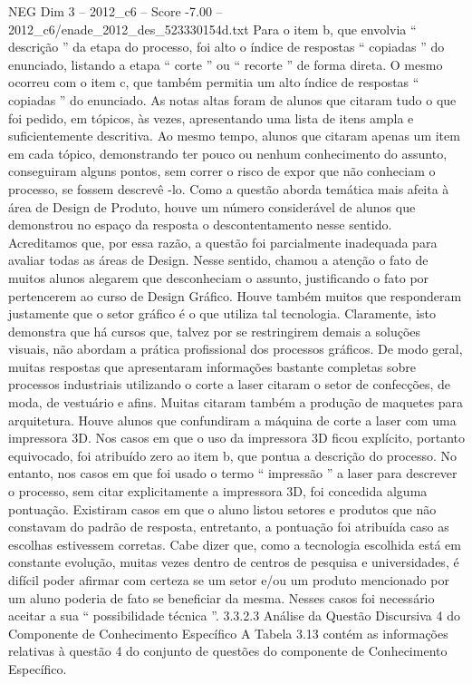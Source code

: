 \begin{textsample}{NEG Dim 3 – 2012\_c6 – Score -7.00 – 2012\_c6/enade\_2012\_des\_523330154d.txt}
Para o item b, que envolvia “ descrição ” da etapa do processo, foi alto o índice de respostas “ copiadas ” do enunciado, listando a etapa “ corte ” ou “ recorte ” de forma direta.
O mesmo ocorreu com o item c, que também permitia um alto índice de respostas “ copiadas ” do enunciado.
As notas altas foram de alunos que citaram tudo o que foi pedido, em tópicos, às vezes, apresentando uma lista de itens ampla e suficientemente descritiva.
Ao mesmo tempo, alunos que citaram apenas um item em cada tópico, demonstrando ter pouco ou nenhum conhecimento do assunto, conseguiram alguns pontos, sem correr o risco de expor que não conheciam o processo, se fossem descrevê -lo.
Como a questão aborda temática mais afeita à área de Design de Produto, houve um número considerável de alunos que demonstrou no espaço da resposta o descontentamento nesse sentido.
Acreditamos que, por essa razão, a questão foi parcialmente inadequada para avaliar todas as áreas de Design.
Nesse sentido, chamou a atenção o fato de muitos alunos alegarem que desconheciam o assunto, justificando o fato por pertencerem ao curso de Design Gráfico.
Houve também muitos que responderam justamente que o setor gráfico é o que utiliza tal tecnologia.
Claramente, isto demonstra que há cursos que, talvez por se restringirem demais a soluções visuais, não abordam a prática profissional dos processos gráficos.
De modo geral, muitas respostas que apresentaram informações bastante completas sobre processos industriais utilizando o corte a laser citaram o setor de confecções, de moda, de vestuário e afins.
Muitas citaram também a produção de maquetes para arquitetura.
Houve alunos que confundiram a máquina de corte a laser com uma impressora 3D.
Nos casos em que o uso da impressora 3D ficou explícito, portanto equivocado, foi atribuído zero ao item b, que pontua a descrição do processo.
No entanto, nos casos em que foi usado o termo “ impressão ” a laser para descrever o processo, sem citar explicitamente a impressora 3D, foi concedida alguma pontuação.
Existiram casos em que o aluno listou setores e produtos que não constavam do padrão de resposta, entretanto, a pontuação foi atribuída caso as escolhas estivessem corretas.
Cabe dizer que, como a tecnologia escolhida está em constante evolução, muitas vezes dentro de centros de pesquisa e universidades, é difícil poder afirmar com certeza se um setor e/ou um produto mencionado por um aluno poderia de fato se beneficiar da mesma.
Nesses casos foi necessário aceitar a sua “ possibilidade técnica ”. 3.3.2.3 Análise da Questão Discursiva 4 do Componente de Conhecimento Específico A Tabela 3.13 contém as informações relativas à questão 4 do conjunto de questões do componente de Conhecimento Específico.

\end{textsample}
